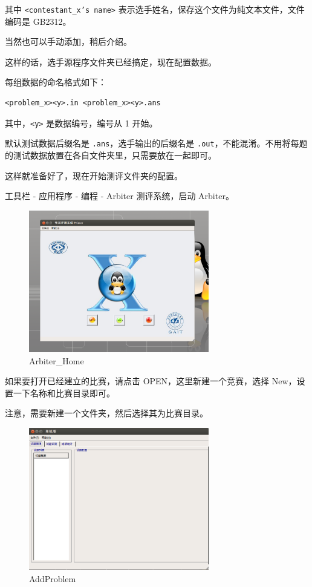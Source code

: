 其中 \texttt{<contestant\_x's name>} 表示选手姓名，保存这个文件为纯文本文件，文件编码是 GB2312。

当然也可以手动添加，稍后介绍。

这样的话，选手源程序文件夹已经搞定，现在配置数据。

每组数据的命名格式如下：

\begin{verbatim}
<problem_x><y>.in <problem_x><y>.ans
\end{verbatim}

其中，\texttt{<y>} 是数据编号，编号从 1 开始。

默认测试数据后缀名是 \texttt{.ans}，选手输出的后缀名是 \texttt{.out}，不能混淆。不用将每题的测试数据放置在各自文件夹里，只需要放在一起即可。

这样就准备好了，现在开始测评文件夹的配置。

工具栏 - 应用程序 - 编程 - Arbiter 测评系统，启动 Arbiter。

\begin{figure}[htbp]
\centering
\includegraphics[width=0.7\textwidth]{docs/intro/images/arbiter_home.png} 
\caption{Arbiter\_Home}
\end{figure}

如果要打开已经建立的比赛，请点击 OPEN，这里新建一个竞赛，选择 New，设置一下名称和比赛目录即可。

注意，需要新建一个文件夹，然后选择其为比赛目录。

\begin{figure}[htbp]
\centering
\includegraphics[width=0.7\textwidth]{docs/intro/images/arbiter_addproblem.png} 
\caption{AddProblem}
\end{figure}

